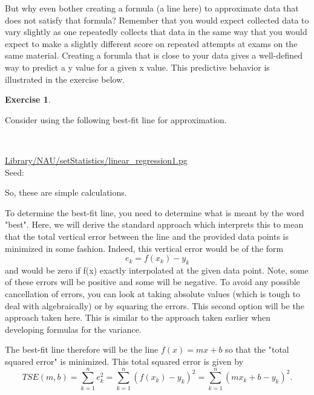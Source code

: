 \documentclass[10pt,]{book}
\theoremstyle{plain}
\theoremstyle{definition}
\theoremstyle{definition}
\theoremstyle{definition}
\newtheorem{exercise}[theorem]{Exercise}
\numberwithin{equation}{section}
\begin{document}
But why even bother creating a formula (a line here) to approximate data that does not satisfy that formula? Remember that you would expect collected data to vary slightly as one repeatedly collects that data in the same way that you would expect to make a slightly different score on repeated attempts at exams on the same material. Creating a forumla that is close to your data gives a well-defined way to predict a y value for a given x value. This predictive behavior is illustrated in the exercise below.
%
\begin{exercise}\label{exercise-5}

		Consider using the following best-fit line for approximation.
\par\medskip
\mbox{}\\ %
\begin{mdframed}
{}\par\vspace*{2ex}%
{\tiny\ttfamily\noindent\url{Library/NAU/setStatistics/linear_regression1.pg}\\Seed: \hfill}\end{mdframed}
\medskip\noindent 
		So, these are simple calculations.
\par
\end{exercise}
\par

To determine the best-fit line, you need to determine what is meant by the word "best". Here, we will derive the standard approach which interprets this to mean that the total vertical error between the line and the provided data points is minimized in some fashion.  Indeed, this vertical error would be of the form
\begin{equation*}e_k = f(x_k) - y_k\end{equation*}
and would be zero if f(x) exactly interpolated at the given data point.  Note, some of these errors will be positive and some will be negative. To avoid any possible cancellation of errors, you can look at taking absolute values (which is tough to deal with algebraically) or by squaring the errors. This second option will be the approach taken here. This is similar to the approach taken earlier when developing formulas for the variance.
%
\par
The best-fit line therefore will be the line \(f(x) = mx+b\) so that the "total squared error" is minimized. This total squared error is given by
\begin{equation*}TSE(m,b) = \sum_{k=1}^n e_k^2 = \sum_{k=1}^n (f(x_k) - y_k)^2 = \sum_{k=1}^n (m x_k + b - y_k)^2.\end{equation*}
%
\par
\end{document}
